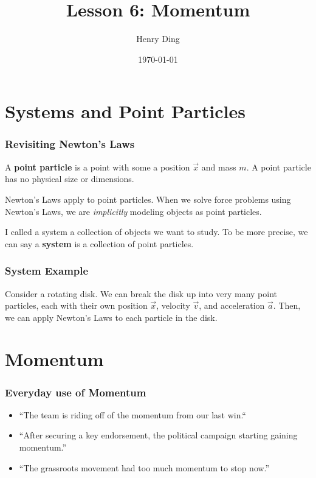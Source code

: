 \documentclass[20pt]{beamer}
\author{Henry Ding}
\date{\today}
\title{Lesson 6: Momentum}
\begin{document}
\frame{\titlepage}

\section{Systems and Point Particles}

\begin{frame}
	\frametitle{Revisiting Newton's Laws}
	\begin{definition}
		A \textbf{point particle} is a point with some a position $\vec{x}$ and mass $m$. A point particle has no physical size or dimensions.
	\end{definition}
	\begin{alertblock}{Newton's Laws apply to point particles.}
		When we solve force problems using Newton's Laws, we are \textit{implicitly} modeling objects as point particles.
	\end{alertblock}
	\begin{definition}
		I called a system a collection of objects we want to study. To be more precise, we can say a \textbf{system} is a collection of point particles.
	\end{definition}
	\begin{figure}[ht]
		\centering
		\label{fig:system}
	\end{figure}
\end{frame}

\begin{frame}
	\frametitle{System Example}
	Consider a rotating disk. We can break the disk up into very many point particles, each with their own position $\vec{x}$, velocity $\vec{v}$, and acceleration $\vec{a}$.
	Then, we can apply Newton's Laws to each particle in the disk.
	\begin{figure}[ht]
		\centering
		\label{fig:disk}
	\end{figure}
\end{frame}

\section{Momentum}

\begin{frame}
	\frametitle{Everyday use of Momentum}
	\begin{itemize}
		\item ``The team is riding off of the momentum from our last win.``
		\item ``After securing a key endorsement, the political campaign starting gaining momentum.''
		\item ``The grassroots movement had too much momentum to stop now.''
	\end{itemize}
\end{frame}
\end{document}
